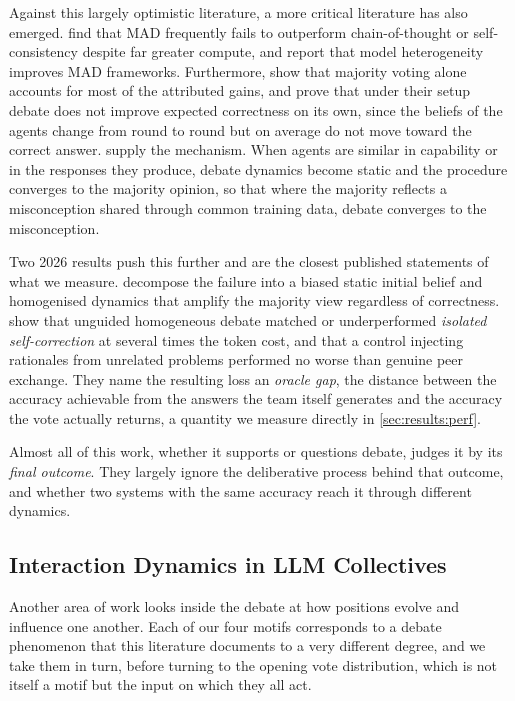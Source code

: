 Against this largely optimistic literature, a more critical literature has also emerged.
\citet{liu2025stopovervaluing} find that \ac{MAD} frequently fails to outperform
chain-of-thought \citep{wei2022chainofthought} or self-consistency
\citep{wang2023selfconsistency} despite far greater compute, and report that
model heterogeneity improves \ac{MAD} frameworks.
Furthermore, \citet{zhang2025debateorvote} show that majority voting alone accounts for most
of the attributed gains, and prove that under their setup debate does not
improve expected correctness on its own, since the beliefs of the agents change from round to
round but on average do not move toward the correct answer. 
\citet{estornell2024multillm} supply the mechanism. When agents are
similar in capability or in the responses they produce, debate dynamics become
static and the procedure converges to the majority opinion, so that where the
majority reflects a misconception shared through common training data, debate
converges to the misconception.

Two 2026 results push this further and are the closest published statements of
what we measure. \citet{oh2026entrenchment} decompose the failure into a biased
static initial belief and homogenised dynamics that amplify the majority view
regardless of correctness. \citet{bertalanic2026costofconsensus} show that
unguided homogeneous debate matched or underperformed \emph{isolated
self-correction} at several times the token cost, and that a control injecting
rationales from unrelated problems performed no worse than genuine peer
exchange. They name the resulting loss an \emph{oracle gap}, the distance
between the accuracy achievable from the answers the team itself generates and the
accuracy the vote actually returns, a quantity we measure directly in
\autoref{sec:results:perf}.

Almost all of this work, whether it supports or questions debate, judges it by
its \emph{final outcome}. They largely ignore the deliberative process behind that
outcome, and whether two systems with the same accuracy reach it through
different dynamics.

\subsection{Interaction Dynamics in \texorpdfstring{\acs{LLM}}{LLM} Collectives}
\label{sec:related:dynamics}

Another area of work looks inside the debate at how positions evolve
and influence one another. Each of our four motifs corresponds to a debate
phenomenon that this literature documents to a very different degree, and we take
them in turn, before turning to the opening vote distribution, which is not
itself a motif but the input on which they all act.

